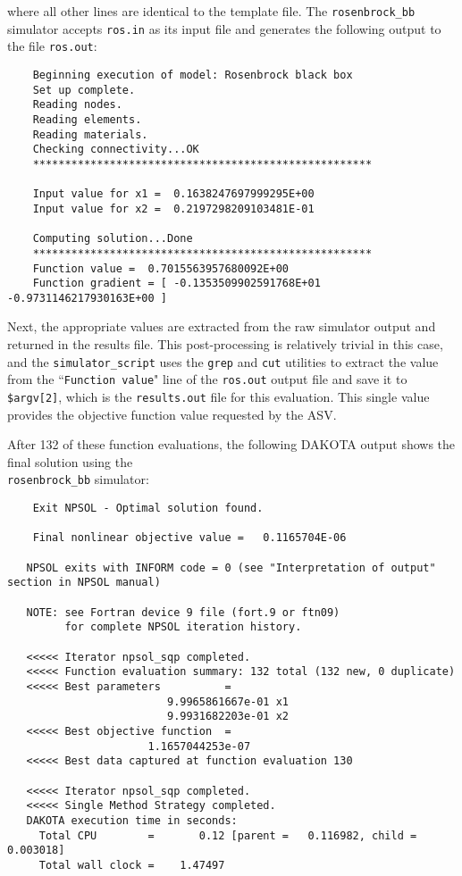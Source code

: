 where all other lines are identical to the template file. The
\texttt{rosenbrock\_bb} simulator accepts \texttt{ros.in} as its input
file and generates the following output to the file \texttt{ros.out}:
\begin{small}
\begin{verbatim}
    Beginning execution of model: Rosenbrock black box
    Set up complete.
    Reading nodes.
    Reading elements.
    Reading materials.
    Checking connectivity...OK
    *****************************************************

    Input value for x1 =  0.1638247697999295E+00
    Input value for x2 =  0.2197298209103481E-01

    Computing solution...Done
    *****************************************************
    Function value =  0.7015563957680092E+00
    Function gradient = [ -0.1353509902591768E+01 -0.9731146217930163E+00 ]
\end{verbatim}
\end{small}

Next, the appropriate values are extracted from the raw simulator output
and returned in the results file. This post-processing is relatively
trivial in this case, and the \texttt{simulator\_script} uses the
\texttt{grep} and \texttt{cut} utilities to extract the value from the
``\texttt{Function value}" line of the \texttt{ros.out} output file and save it to
\texttt{\$argv[2]}, which is the \texttt{results.out} file for this
evaluation. This single value provides the objective function value
requested by the ASV.

After 132 of these function evaluations, the following DAKOTA output
shows the final solution using the \\ \texttt{rosenbrock\_bb} simulator:
\begin{small}
\begin{verbatim}
    Exit NPSOL - Optimal solution found.

    Final nonlinear objective value =   0.1165704E-06

   NPSOL exits with INFORM code = 0 (see "Interpretation of output" section in NPSOL manual)

   NOTE: see Fortran device 9 file (fort.9 or ftn09)
         for complete NPSOL iteration history.

   <<<<< Iterator npsol_sqp completed.
   <<<<< Function evaluation summary: 132 total (132 new, 0 duplicate)
   <<<<< Best parameters          =
                         9.9965861667e-01 x1
                         9.9931682203e-01 x2
   <<<<< Best objective function  =
                      1.1657044253e-07
   <<<<< Best data captured at function evaluation 130

   <<<<< Iterator npsol_sqp completed.
   <<<<< Single Method Strategy completed.
   DAKOTA execution time in seconds:
     Total CPU        =       0.12 [parent =   0.116982, child =   0.003018]
     Total wall clock =    1.47497
\end{verbatim}
\end{small}

